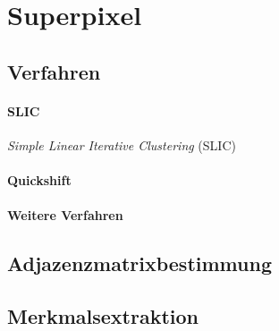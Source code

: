 \section{Superpixel}
\label{superpixel}

\subsection{Verfahren}
\label{superpixel_verfahren}

\paragraph{SLIC}
\label{slic}

\emph{Simple Linear Iterative Clustering} (SLIC)

\paragraph{Quickshift}
\label{quickshift}

\paragraph{Weitere Verfahren}
\label{weitere_superpixel_verfahren}

\subsection{Adjazenzmatrixbestimmung}
\label{adjazenzmatrixbestimmung}

\subsection{Merkmalsextraktion}
\label{merkmalsextraktion}
